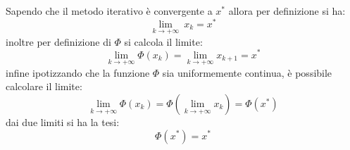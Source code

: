 Sapendo che il metodo iterativo è convergente a \( x^* \) allora per definizione si ha:
 \[
	\lim_{k \to +\infty}\ x_k = x^*
\]
 inoltre per definizione di \( \Phi \) si calcola il limite:
\[
    \lim_{k \to +\infty} \Phi(x_k) = \lim_{k \to +\infty} x_{k+1} = x^*
\]
 infine ipotizzando che la funzione \( \Phi \) sia uniformemente continua, è possibile calcolare il limite:
\[
    \lim_{k \to +\infty} \Phi(x_k) = \Phi(\lim_{k \to +\infty} x_k) = \Phi(x^*)
\]
 dai due limiti si ha la tesi:
\[
    \Phi(x^*) = x^* 
\]
